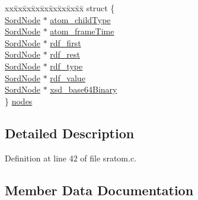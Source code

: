 \begin{DoxyCompactItemize}
\item 
\begin{tabbing}
xx\=xx\=xx\=xx\=xx\=xx\=xx\=xx\=xx\=\kill
struct \{\\
\>\hyperlink{group__sord_ga804ac7d56d9fdea50f2d1e7278b1f82b}{SordNode} $\ast$ \hyperlink{struct_sratom_impl_afda1cc8e25dbe39537a8ea14ce6a13f6}{atom\_childType}\\
\>\hyperlink{group__sord_ga804ac7d56d9fdea50f2d1e7278b1f82b}{SordNode} $\ast$ \hyperlink{struct_sratom_impl_a789b9f772ea20294e88cf57259662fcb}{atom\_frameTime}\\
\>\hyperlink{group__sord_ga804ac7d56d9fdea50f2d1e7278b1f82b}{SordNode} $\ast$ \hyperlink{struct_sratom_impl_ab217a428cbf5c6712b07e401a389a5ed}{rdf\_first}\\
\>\hyperlink{group__sord_ga804ac7d56d9fdea50f2d1e7278b1f82b}{SordNode} $\ast$ \hyperlink{struct_sratom_impl_ac22e7aa34a09b5060f0f7097cc30dead}{rdf\_rest}\\
\>\hyperlink{group__sord_ga804ac7d56d9fdea50f2d1e7278b1f82b}{SordNode} $\ast$ \hyperlink{struct_sratom_impl_a2daf6cb2e9c142fc44c70ab794e5e015}{rdf\_type}\\
\>\hyperlink{group__sord_ga804ac7d56d9fdea50f2d1e7278b1f82b}{SordNode} $\ast$ \hyperlink{struct_sratom_impl_a3b6174585bc90862b6a1f0b10dc854a1}{rdf\_value}\\
\>\hyperlink{group__sord_ga804ac7d56d9fdea50f2d1e7278b1f82b}{SordNode} $\ast$ \hyperlink{struct_sratom_impl_a462d8e3fe91bed3dfeebc00672eb7534}{xsd\_base64Binary}\\
\} \hyperlink{struct_sratom_impl_a15bb88ec2d18bbedbab413ccc7f5853c}{nodes}\\

\end{tabbing}\end{DoxyCompactItemize}


\subsection{Detailed Description}


Definition at line 42 of file sratom.\+c.



\subsection{Member Data Documentation}
